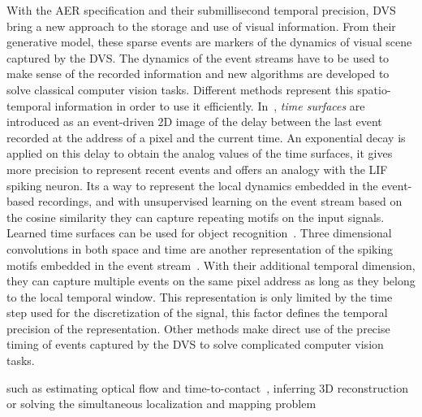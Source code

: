 \documentclass[brainsci, %
               review,submit,pdftex,moreauthors
               ]{Definitions/mdpi}
\begin{document}
With the AER specification and their submillisecond temporal precision, DVS bring a new approach to the storage and use of visual information. From their generative model, these sparse events are markers of the dynamics of visual scene captured by the DVS. The dynamics of the event streams have to be used to make sense of the recorded information and new algorithms are developed to solve classical computer vision tasks. Different methods represent this spatio-temporal information in order to use it efficiently.  In~\cite{lagorce_hots_2017}, \textit{time surfaces} are introduced as an event-driven 2D image of the delay between the last event recorded at the address of a pixel and the current time. An exponential decay is applied on this delay to obtain the analog values of the time surfaces, it gives more precision to represent recent events and offers an analogy with the LIF spiking neuron. Its a way to represent the local dynamics embedded in the event-based recordings, and with unsupervised learning on the event stream based on the cosine similarity they can capture repeating motifs on the input signals. Learned time surfaces can be used for object recognition~\citep{lagorce_hots_2017, sironi_hats_2018, maro_event_2020, grimaldi_homeostatic_2021,grimaldi_robust_2022}. Three dimensional convolutions in both space and time are another representation of the spiking motifs embedded in the event stream~\citep{ghosh_spatiotemporal_2019, grimaldi_learning_2022}. With their additional temporal dimension, they can capture multiple events on the same pixel address as long as they belong to the local temporal window. This representation is only limited by the time step used for the discretization of the signal, this factor defines the temporal precision of the representation. Other methods make direct use of the precise timing of events captured by the DVS to solve complicated computer vision tasks. 


such as estimating optical flow and time-to-contact~\cite{benosman2013event, tschechne2014bio, bardow2016simultaneous}, inferring 3D reconstruction~\cite{hidalgo2020learning, osswald2017spiking, zhu2018realtime} or solving the simultaneous localization and mapping problem~\cite{gallego2017event, kim2016real} %

\end{document}
